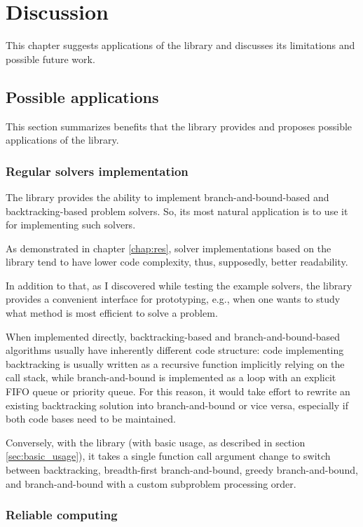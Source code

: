 \chapter{Discussion}
\label{chap:discuss}

This chapter suggests applications of the library and discusses its limitations
and possible future work.

\section{Possible applications}

This section summarizes benefits that the library provides and proposes possible applications
of the library.

\subsection{Regular solvers implementation}

The library provides the ability to implement branch-and-bound-based and backtracking-based
problem solvers. So, its most natural application is to use it for implementing such solvers.

As demonstrated in chapter \ref{chap:res}, solver implementations based on the library
tend to have lower code complexity, thus, supposedly, better readability.

In addition to that, as I discovered while testing the example solvers,
the library provides a convenient interface for prototyping, e.g., when one wants to study
what method is most efficient to solve a problem.

When implemented directly,
backtracking-based and branch-and-bound-based algorithms usually have inherently different
code structure: code implementing backtracking is usually written as a recursive function
implicitly relying on the call stack, while branch-and-bound is implemented as a loop
with an explicit FIFO queue or priority queue. For this reason, it would take effort
to rewrite an existing backtracking solution into branch-and-bound or vice versa, especially
if both code bases need to be maintained.

Conversely, with the library (with basic usage, as described in section
\ref{sec:basic_usage}), it takes a single function call argument change to switch between
backtracking, breadth-first branch-and-bound, greedy branch-and-bound, and
branch-and-bound with a custom subproblem processing order.

\subsection{Reliable computing}

